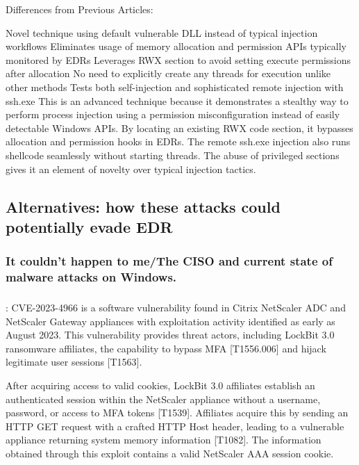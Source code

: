 \documentclass{article}
\begin{document}
Differences from Previous Articles:

Novel technique using default vulnerable DLL instead of typical injection workflows
Eliminates usage of memory allocation and permission APIs typically monitored by EDRs
Leverages RWX section to avoid setting execute permissions after allocation
No need to explicitly create any threads for execution unlike other methods
Tests both self-injection and sophisticated remote injection with ssh.exe
This is an advanced technique because it demonstrates a stealthy way to perform process injection using a permission misconfiguration instead of easily detectable Windows APIs. By locating an existing RWX code section, it bypasses allocation and permission hooks in EDRs. The remote ssh.exe injection also runs shellcode seamlessly without starting threads. The abuse of privileged sections gives it an element of novelty over typical injection tactics.


\subsection{Alternatives: how these attacks could potentially evade EDR}

\subsubsection{It couldn't happen to me/The CISO and current state of malware attacks on Windows.}

\subsubsection{\textcite{CISA:2023a}}
\textbf{}:  CVE-2023-4966 is a software vulnerability found in Citrix NetScaler ADC and NetScaler Gateway appliances with exploitation activity identified as early as August 2023. This vulnerability provides threat actors, including LockBit 3.0 ransomware affiliates, the capability to bypass MFA [T1556.006] and hijack legitimate user sessions [T1563].

After acquiring access to valid cookies, LockBit 3.0 affiliates establish an authenticated session within the NetScaler appliance without a username, password, or access to MFA tokens [T1539]. Affiliates acquire this by sending an HTTP GET request with a crafted HTTP Host header, leading to a vulnerable appliance returning system memory information [T1082]. The information obtained through this exploit contains a valid NetScaler AAA session cookie.
\end{document}
